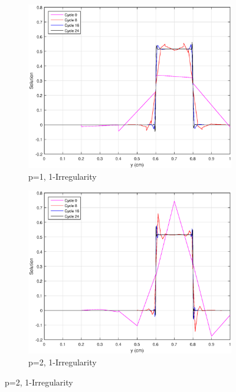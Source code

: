 \begin{figure}
\centering
{
	\begin{subfigure}[b]{0.45\textwidth}
		\centering
		\label{subfig::SL_uniform_ef_mv1_irr1}
		\includegraphics[width=\textwidth]{figures/sec_BF/SL_AMR_MV_k1_Irr1.eps}
		\caption{p=1, 1-Irregularity}
	\end{subfigure}
	\hfill
	\begin{subfigure}[b]{0.45\textwidth}
		\centering
		\label{subfig::SL_uniform_ef_mv2_irr1}
		\includegraphics[width=\textwidth]{figures/sec_BF/SL_AMR_MV_k2_Irr1.eps}
		\caption{p=2, 1-Irregularity}
	\end{subfigure}
}
\end{figure}
